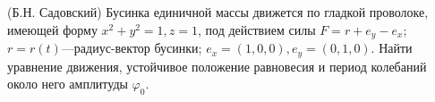 (Б.Н. Садовский)
Бусинка единичной массы движется по гладкой проволоке, имеющей
форму $x^2+y^2=1,z=1$, под действием силы $F=r+e_y-e_x$;
$r=r(t)$---радиус-вектор бусинки; $e_x=(1,0,0),e_y=(0,1,0)$. Найти уравнение
движения, устойчивое положение равновесия и период колебаний около
него амплитуды $\varphi_0$.
